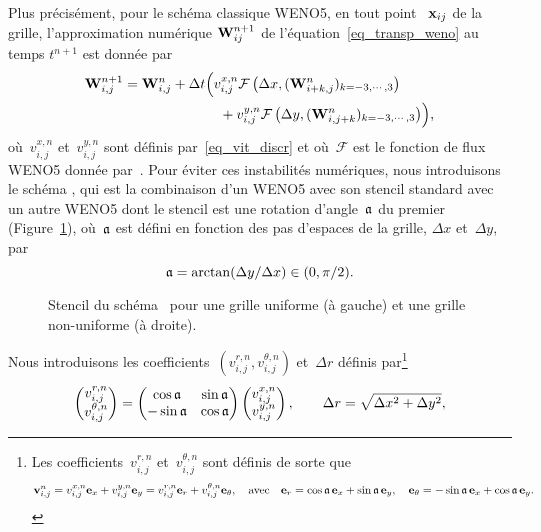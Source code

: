 \documentclass[main.tex]{subfiles}
\begin{document}
Plus précisément, pour le schéma classique WENO5, en tout point 
~$\mathbf{x}_{ij}$ de la grille, l'approximation numérique 
${\bf W}^{n+1}_{ij}$ de l'équation~\eqref{eq_transp_weno} au temps 
$t^{n+1}$ est donnée par
\begin{equation}\label{eq:WENO5}
\begin{aligned}
{\bf W}^{n+1}_{i,j}={\bf W}^n_{i,j} + \Delta t & \Bigl(v_{i,j}^{x,n}
\mathcal{F}\left(\Delta x,({\bf W}^n_{i+k,j})_{k=-3,\cdots, 3}\right) \\
&\quad +v_{i,j}^{y,n} \mathcal{F}\left(\Delta y,({\bf W}^n_{i,j+k})_{k=-3,\cdots, 3}\right)\Bigr),
\end{aligned}
\end{equation}
où~$v_{i,j}^{x,n} $ et~$v_{i,j}^{y,n}$ sont définis par~\eqref{eq_vit_discr} et où~$\mathcal{F}$ est le fonction de flux WENO5 donnée par~\cite{Liu1994}. 
Pour éviter ces instabilités numériques, nous introduisons le schéma \twinweno, qui est la combinaison d'un WENO5 avec son stencil standard avec un autre WENO5 dont le stencil est une rotation d'angle~${\mathfrak{a}}$ du premier (\cf Figure~\ref{fig:stencil_weno5_twin}), où~${\mathfrak{a}}$ est défini en fonction des pas d'espaces de la grille, $\Delta x$ et~$\Delta y$, par 
 $${\mathfrak{a}}=\arctan (\Delta y/\Delta x)\in (0,\pi/2). $$
\begin{figure}[h]
  \centering
\subfloat[Grille uniforme~$\thickmuskip=1mu  \Delta x=\Delta y$]{}
\caption{Stencil du schéma \twinweno\ pour une grille uniforme (à gauche)
  et une grille non-uniforme (à droite).} \label{fig:stencil_weno5_twin}
\end{figure} 
Nous introduisons les coefficients~$(v^{r,n}_{i,j},
v^{\theta,n}_{i,j})$ et~$\Delta r$ définis par\footnote{Les coefficients~$v^{r,n}_{i,j}$
  et~$v^{\theta,n}_{i,j}$ sont définis de sorte que 
$$\mathbf{v}^n_{i,j}=v^{x,n}_{i,j}{\bf e}_x+v^{y,n}_{i,j}{\bf e}_y=v^{r,n}_{i,j}{\bf e}_r+v^{\theta,n}_{i,j}{\bf e}_{\theta},\quad\text{avec}\quad 
{\bf e}_r=\cos{\mathfrak{a}}\,{\bf e}_x+\sin{\mathfrak{a}}\,{\bf e}_y,\quad {\bf e}_{\theta}=-\sin{\mathfrak{a}}\,{\bf e}_x+\cos{\mathfrak{a}}\, {\bf e}_y.$$}
\begin{equation}
\begin{pmatrix}
v^{r,n}_{i,j} \\ v^{\theta,n}_{i,j}
\end{pmatrix} = \begin{pmatrix}
\cos {\mathfrak{a}} & \sin {\mathfrak{a}} \\ -\sin {\mathfrak{a}} & \cos {\mathfrak{a}}
\end{pmatrix} \begin{pmatrix}
v^{x,n}_{i,j} \\ v^{y,n}_{i,j}
\end{pmatrix}, \qquad  \Delta r=\sqrt{\Delta x^2+\Delta y^2},
\end{equation}
\end{document}
